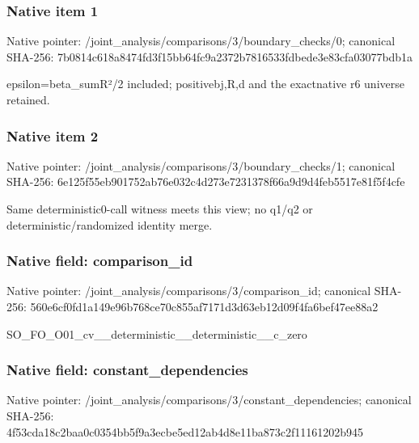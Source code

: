 \documentclass[10pt,a4paper]{article}
\begin{document}
\subsubsection{Native item 1}
Native pointer: /joint\_\allowbreak{}analysis/comparisons/3/boundary\_\allowbreak{}checks/0; canonical SHA-256: 7b0814c618a8474fd3f15bb64fc9a2372b7816533fdbede3e83cfa03077bdb1a

\begingroup\raggedright\sloppy epsilon=\allowbreak{}beta\_\allowbreak{}sumR{\AtlasUnicodeText ²}\allowbreak{}/\allowbreak{}2 included;\allowbreak{} positivebj,\allowbreak{}R,\allowbreak{}d and the exactnative r6 universe retained.\par\endgroup

\subsubsection{Native item 2}
Native pointer: /joint\_\allowbreak{}analysis/comparisons/3/boundary\_\allowbreak{}checks/1; canonical SHA-256: 6e125f55eb901752ab76e032c4d273e7231378f66a9d9d4feb5517e81f5f4cfe

\begingroup\raggedright\sloppy Same deterministic0-call witness meets this view;\allowbreak{} no q1/\allowbreak{}q2 or deterministic/\allowbreak{}randomized identity merge.\par\endgroup

\subsubsection{Native field: comparison\_\allowbreak{}id}
Native pointer: /joint\_\allowbreak{}analysis/comparisons/3/comparison\_\allowbreak{}id; canonical SHA-256: 560e6cf0fd1a149e96b768ce70c855af7171d3d63eb12d09f4fa6bef47ee88a2

\begingroup\raggedright\sloppy SO\_\allowbreak{}FO\_\allowbreak{}O01\_\allowbreak{}cv\_\allowbreak{}\_\allowbreak{}deterministic\_\allowbreak{}\_\allowbreak{}deterministic\_\allowbreak{}\_\allowbreak{}c\_\allowbreak{}zero\par\endgroup

\subsubsection{Native field: constant\_\allowbreak{}dependencies}
Native pointer: /joint\_\allowbreak{}analysis/comparisons/3/constant\_\allowbreak{}dependencies; canonical SHA-256: 4f53cda18c2baa0c0354bb5f9a3ecbe5ed12ab4d8e11ba873c2f11161202b945
\end{document}
